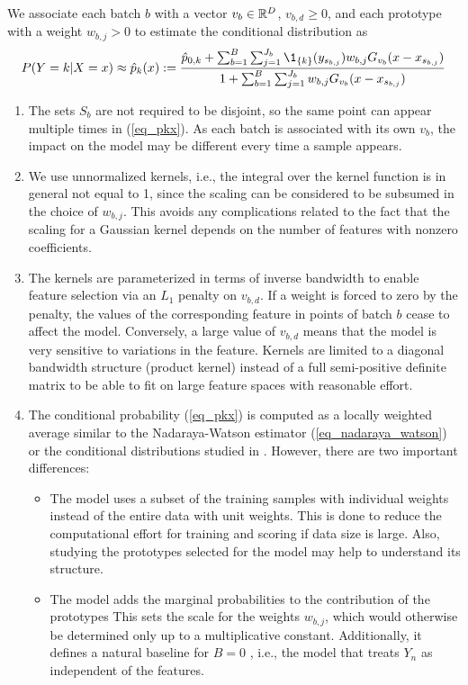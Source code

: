 %
We associate each batch $b$ with a vector $v_b\in\mathbb{R}^D$, $v_{b,d}\geq0$, and each prototype with a weight $w_{b,j}>0$ to estimate the conditional distribution as
%
\begin{equation}
P(Y=k|X=x)\approx\hat{p}_k(x):=
\frac{\hat{p}_{0,k}+\sum_{b=1}^B\sum_{j=1}^{J_b}\1_{\{k\}}(y_{s_{b,j}})w_{b,j}G_{v_b}(x-x_{s_{b,j}})}
{1+\sum_{b=1}^B\sum_{j=1}^{J_b}w_{b,j}G_{v_b}(x-x_{s_{b,j}})}
\label{eq_pkx}
\end{equation}
%
\begin{remark}
\begin{enumerate}
\item The sets $S_b$ are not required to be disjoint, so the same point can appear multiple times in (\ref{eq_pkx}).
As each batch is associated with its own $v_b$, the impact on the model may be different every time a sample appears.
%
\item We use unnormalized kernels, i.e., the integral over the kernel function is in general not equal to 1, since the scaling can be considered to be subsumed in the choice of $w_{b,j}$.
This avoids any complications related to the fact that the scaling for a Gaussian kernel depends on the number of features with nonzero coefficients.
%
\item The kernels are parameterized in terms of inverse bandwidth to enable feature selection via an $L_1$ penalty on $v_{b,d}$.
If a weight is forced to zero by the penalty, the values of the corresponding feature in points of batch $b$ cease to affect the model.
Conversely, a large value of $v_{b,d}$ means that the model is very sensitive to variations in the feature.
Kernels are limited to a diagonal bandwidth structure (product kernel) instead of a full semi-positive definite matrix to be able to fit on large feature spaces with reasonable effort.
%
\item The conditional probability (\ref{eq_pkx}) is computed as a locally weighted average similar to the Nadaraya-Watson estimator (\ref{eq_nadaraya_watson}) or the conditional distributions studied in \cite{Hall_04}.
However, there are two important differences:
%
\begin{itemize}
\item The model uses a subset of the training samples with individual weights instead of the entire data with unit weights.
This is done to reduce the computational effort for training and scoring if data size is large.
Also, studying the prototypes selected for the model may help to understand its structure.
%
\item The model adds the marginal probabilities to the contribution of the prototypes
This sets the scale for the weights $w_{b,j}$, which would otherwise be determined only up to a multiplicative constant.
Additionally, it defines a natural baseline for $B=0$ , i.e., the model that treats $Y_n$ as independent of the features.
\end{itemize}
\end{enumerate}
\end{remark}
